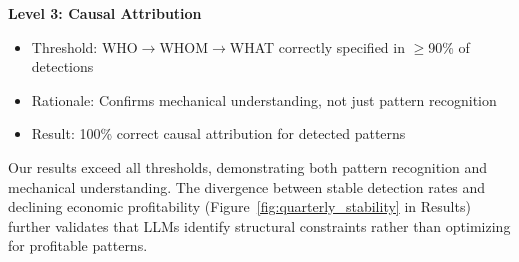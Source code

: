 \textbf{Level 3: Causal Attribution}
\begin{itemize}
\item Threshold: WHO$\rightarrow$WHOM$\rightarrow$WHAT correctly specified in $\geq$90\% of detections
\item Rationale: Confirms mechanical understanding, not just pattern recognition
\item Result: 100\% correct causal attribution for detected patterns
\end{itemize}

Our results exceed all thresholds, demonstrating both pattern recognition and mechanical understanding. The divergence between stable detection rates and declining economic profitability (Figure~\ref{fig:quarterly_stability} in Results) further validates that LLMs identify structural constraints rather than optimizing for profitable patterns.
